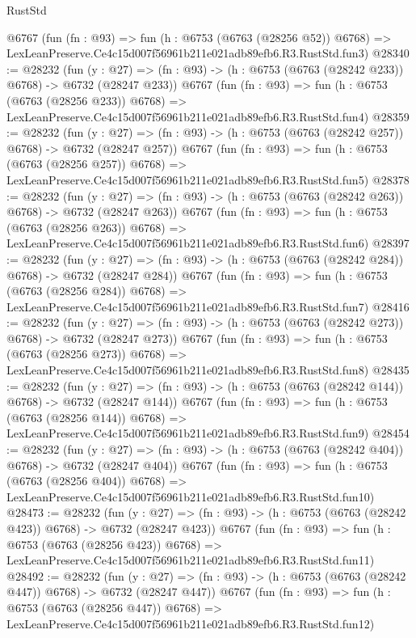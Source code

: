 \begin{lexlean}{RustStd}
\begin{coremodule}
    @6767
    (fun (fn : @93) =>
    fun (h : @6753 (@6763 (@28256 @52)) @6768) =>
    LexLeanPreserve.Ce4c15d007f56961b211e021adb89efb6.R3.RustStd.fun3)
@28340 := @28232
    (fun (y : @27) => (fn : @93) -> (h : @6753 (@6763 (@28242 @233)) @6768) -> @6732 (@28247 @233))
    @6767
    (fun (fn : @93) =>
    fun (h : @6753 (@6763 (@28256 @233)) @6768) =>
    LexLeanPreserve.Ce4c15d007f56961b211e021adb89efb6.R3.RustStd.fun4)
@28359 := @28232
    (fun (y : @27) => (fn : @93) -> (h : @6753 (@6763 (@28242 @257)) @6768) -> @6732 (@28247 @257))
    @6767
    (fun (fn : @93) =>
    fun (h : @6753 (@6763 (@28256 @257)) @6768) =>
    LexLeanPreserve.Ce4c15d007f56961b211e021adb89efb6.R3.RustStd.fun5)
@28378 := @28232
    (fun (y : @27) => (fn : @93) -> (h : @6753 (@6763 (@28242 @263)) @6768) -> @6732 (@28247 @263))
    @6767
    (fun (fn : @93) =>
    fun (h : @6753 (@6763 (@28256 @263)) @6768) =>
    LexLeanPreserve.Ce4c15d007f56961b211e021adb89efb6.R3.RustStd.fun6)
@28397 := @28232
    (fun (y : @27) => (fn : @93) -> (h : @6753 (@6763 (@28242 @284)) @6768) -> @6732 (@28247 @284))
    @6767
    (fun (fn : @93) =>
    fun (h : @6753 (@6763 (@28256 @284)) @6768) =>
    LexLeanPreserve.Ce4c15d007f56961b211e021adb89efb6.R3.RustStd.fun7)
@28416 := @28232
    (fun (y : @27) => (fn : @93) -> (h : @6753 (@6763 (@28242 @273)) @6768) -> @6732 (@28247 @273))
    @6767
    (fun (fn : @93) =>
    fun (h : @6753 (@6763 (@28256 @273)) @6768) =>
    LexLeanPreserve.Ce4c15d007f56961b211e021adb89efb6.R3.RustStd.fun8)
@28435 := @28232
    (fun (y : @27) => (fn : @93) -> (h : @6753 (@6763 (@28242 @144)) @6768) -> @6732 (@28247 @144))
    @6767
    (fun (fn : @93) =>
    fun (h : @6753 (@6763 (@28256 @144)) @6768) =>
    LexLeanPreserve.Ce4c15d007f56961b211e021adb89efb6.R3.RustStd.fun9)
@28454 := @28232
    (fun (y : @27) => (fn : @93) -> (h : @6753 (@6763 (@28242 @404)) @6768) -> @6732 (@28247 @404))
    @6767
    (fun (fn : @93) =>
    fun (h : @6753 (@6763 (@28256 @404)) @6768) =>
    LexLeanPreserve.Ce4c15d007f56961b211e021adb89efb6.R3.RustStd.fun10)
@28473 := @28232
    (fun (y : @27) => (fn : @93) -> (h : @6753 (@6763 (@28242 @423)) @6768) -> @6732 (@28247 @423))
    @6767
    (fun (fn : @93) =>
    fun (h : @6753 (@6763 (@28256 @423)) @6768) =>
    LexLeanPreserve.Ce4c15d007f56961b211e021adb89efb6.R3.RustStd.fun11)
@28492 := @28232
    (fun (y : @27) => (fn : @93) -> (h : @6753 (@6763 (@28242 @447)) @6768) -> @6732 (@28247 @447))
    @6767
    (fun (fn : @93) =>
    fun (h : @6753 (@6763 (@28256 @447)) @6768) =>
    LexLeanPreserve.Ce4c15d007f56961b211e021adb89efb6.R3.RustStd.fun12)

\end{coremodule}
\end{lexlean}
